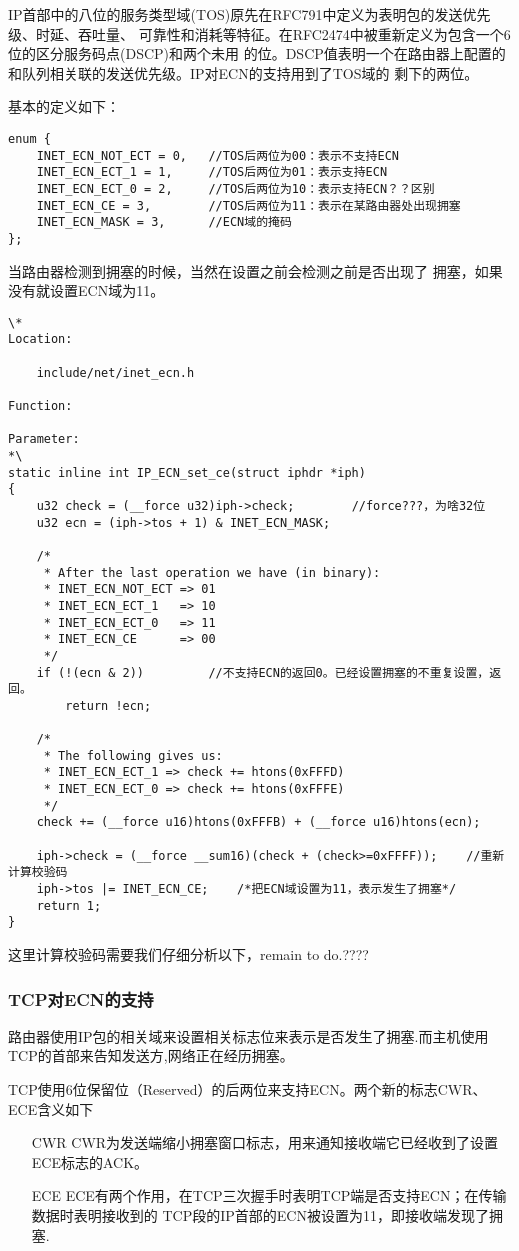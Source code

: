 			IP首部中的八位的服务类型域(TOS)原先在RFC791中定义为表明包的发送优先级、时延、吞吐量、
			可靠性和消耗等特征。在RFC2474中被重新定义为包含一个6位的区分服务码点(DSCP)和两个未用
			的位。DSCP值表明一个在路由器上配置的和队列相关联的发送优先级。IP对ECN的支持用到了TOS域的
			剩下的两位。

			基本的定义如下：
\begin{verbatim}
enum {
	INET_ECN_NOT_ECT = 0,	//TOS后两位为00：表示不支持ECN
	INET_ECN_ECT_1 = 1,		//TOS后两位为01：表示支持ECN
	INET_ECN_ECT_0 = 2,		//TOS后两位为10：表示支持ECN？？区别
	INET_ECN_CE = 3,		//TOS后两位为11：表示在某路由器处出现拥塞
	INET_ECN_MASK = 3,		//ECN域的掩码
};
\end{verbatim}


			当路由器检测到拥塞的时候，当然在设置之前会检测之前是否出现了
			拥塞，如果没有就设置ECN域为11。

\begin{verbatim}
\*
Location:

	include/net/inet_ecn.h

Function:

Parameter:
*\
static inline int IP_ECN_set_ce(struct iphdr *iph)
{
	u32 check = (__force u32)iph->check;		//force???，为啥32位
	u32 ecn = (iph->tos + 1) & INET_ECN_MASK;

	/*
	 * After the last operation we have (in binary):
	 * INET_ECN_NOT_ECT => 01
	 * INET_ECN_ECT_1   => 10
	 * INET_ECN_ECT_0   => 11
	 * INET_ECN_CE      => 00
	 */
	if (!(ecn & 2))			//不支持ECN的返回0。已经设置拥塞的不重复设置，返回。
		return !ecn;
	
	/*
	 * The following gives us:
	 * INET_ECN_ECT_1 => check += htons(0xFFFD)
	 * INET_ECN_ECT_0 => check += htons(0xFFFE)
	 */
	check += (__force u16)htons(0xFFFB) + (__force u16)htons(ecn);
	
	iph->check = (__force __sum16)(check + (check>=0xFFFF));	//重新计算校验码
	iph->tos |= INET_ECN_CE;	/*把ECN域设置为11，表示发生了拥塞*/
	return 1;
}
\end{verbatim}

		这里计算校验码需要我们仔细分析以下，remain to do.????
		
		\subsubsection{TCP对ECN的支持}
			路由器使用IP包的相关域来设置相关标志位来表示是否发生了拥塞.而主机使用TCP的首部来告知发送方,网络正在经历拥塞。
			
			TCP使用6位保留位（Reserved）的后两位来支持ECN。两个新的标志CWR、ECE含义如下
\begin{enumerate}
\item[CWR]	CWR为发送端缩小拥塞窗口标志，用来通知接收端它已经收到了设置ECE标志的ACK。
			
\item[ECE]	ECE有两个作用，在TCP三次握手时表明TCP端是否支持ECN；在传输数据时表明接收到的
			TCP段的IP首部的ECN被设置为11，即接收端发现了拥塞.
\end{enumerate}

